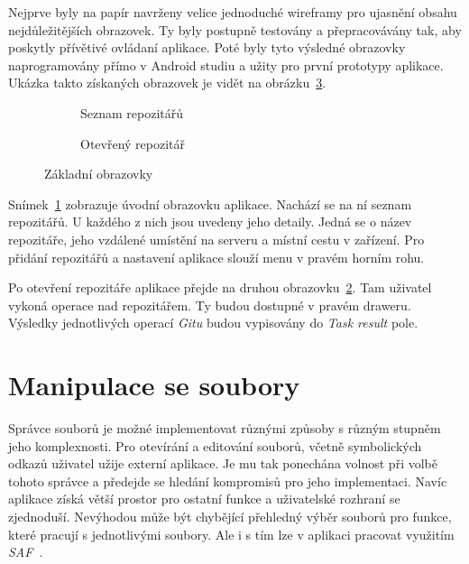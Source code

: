 Nejprve byly na papír navrženy velice jednoduché wireframy pro ujasnění obsahu nejdůležitějších obrazovek. Ty byly postupně testovány a přepracovávány tak, aby poskytly přívětivé ovládaní aplikace. Poté byly tyto výsledné obrazovky naprogramovány přímo v Android studiu a užity pro první prototypy aplikace. Ukázka takto získaných obrazovek je vidět na obrázku~\ref{fig:obrazovky}.

\begin{figure}[ht]
    \vspace{0.5cm}
    \centering
    \begin{subfigure}{.4\textwidth}        
        \centering
        \caption{Seznam repozitářů}\label{fig:orig}
        \label{fig:repolist_frame}
    \end{subfigure}
    \begin{subfigure}{.4\textwidth}
        \centering
        \caption{Otevřený repozitář}
        \label{fig:result_frame}
    \end{subfigure}
\caption{Základní obrazovky}%
\label{fig:obrazovky}%
\end{figure}

Snímek~\ref{fig:repolist_frame} zobrazuje úvodní obrazovku aplikace. Nachází se na ní seznam repozitářů. U každého z nich jsou uvedeny jeho detaily. Jedná se o název repozitáře, jeho vzdálené umístění na serveru a místní cestu v zařízení. Pro přidání repozitářů a nastavení aplikace slouží menu v pravém horním rohu. 

Po otevření repozitáře aplikace přejde na druhou obrazovku~\ref{fig:result_frame}. Tam uživatel vykoná operace nad repozitářem. Ty budou dostupné v pravém draweru. Výsledky jednotlivých operací \emph{Gitu} budou vypisovány do \emph{Task result} pole.

\section{Manipulace se soubory}
Správce souborů je možné implementovat různými způsoby s různým stupněm jeho komplexnosti. Pro otevírání a editování souborů, včetně symbolických odkazů uživatel užije externí aplikace. Je mu tak ponechána volnost při volbě tohoto správce a předejde se hledání kompromisů pro jeho implementaci. Navíc aplikace  získá větší prostor pro ostatní funkce a uživatelské rozhraní se zjednoduší. Nevýhodou může být chybějící přehledný výběr souborů pro funkce, které pracují s jednotlivými soubory. Ale i s tím lze v aplikaci pracovat využitím \emph{SAF~}.

